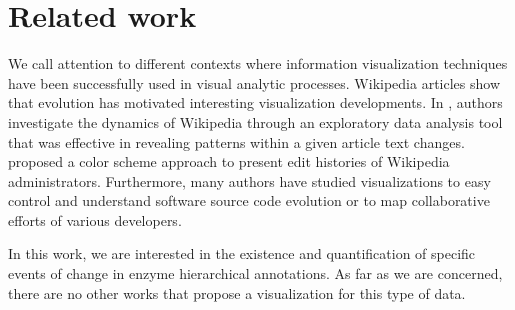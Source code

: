 \section{Related work}
\label{sec:related_work}

We call attention to different contexts where information visualization techniques have been successfully used in visual analytic processes. Wikipedia articles show that evolution has motivated interesting visualization developments. In \cite{viegasetal2004}, authors investigate the dynamics of Wikipedia through an exploratory data analysis tool that was effective in revealing patterns within a given article text changes. \cite{watenbergetal2007} proposed a color scheme approach to present edit histories of Wikipedia administrators. Furthermore, many authors \cite{holt1996, lanza2001, rysselberghe2004, voineaetal2005} have studied visualizations to easy control and understand software source code evolution or to map collaborative efforts of various developers. 

In this work, we are interested in the existence and quantification of specific events of change in enzyme hierarchical annotations. As far as we are concerned, there are no other works that propose a visualization for this type of data.
